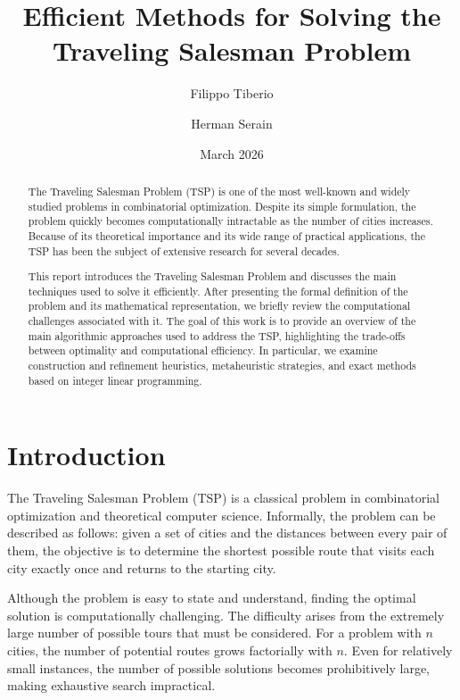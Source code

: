 \documentclass{article}
\title{Efficient Methods for Solving the Traveling Salesman Problem}
\author{Filippo Tiberio \and Herman Serain}
\date{March 2026}
\begin{document}
\maketitle

\begin{abstract}
The Traveling Salesman Problem (TSP) is one of the most well-known and widely studied problems
in combinatorial optimization. Despite its simple formulation, the problem quickly becomes
computationally intractable as the number of cities increases. Because of its theoretical
importance and its wide range of practical applications, the TSP has been the subject of
extensive research for several decades.

This report introduces the Traveling Salesman Problem and discusses the main techniques used
to solve it efficiently. After presenting the formal definition of the problem and its
mathematical representation, we briefly review the computational challenges associated with
it. The goal of this work is to provide an overview of the main algorithmic approaches used
to address the TSP, highlighting the trade-offs between optimality and computational
efficiency. In particular, we examine construction and refinement heuristics, metaheuristic
strategies, and exact methods based on integer linear programming.
\end{abstract}

\tableofcontents
\newpage

\section{Introduction}

The Traveling Salesman Problem (TSP) is a classical problem in combinatorial optimization
and theoretical computer science. Informally, the problem can be described as follows: given
a set of cities and the distances between every pair of them, the objective is to determine
the shortest possible route that visits each city exactly once and returns to the starting
city.

Although the problem is easy to state and understand, finding the optimal solution is
computationally challenging. The difficulty arises from the extremely large number of
possible tours that must be considered. For a problem with $n$ cities, the number of
potential routes grows factorially with $n$. Even for relatively small instances, the number
of possible solutions becomes prohibitively large, making exhaustive search impractical.
\end{document}
